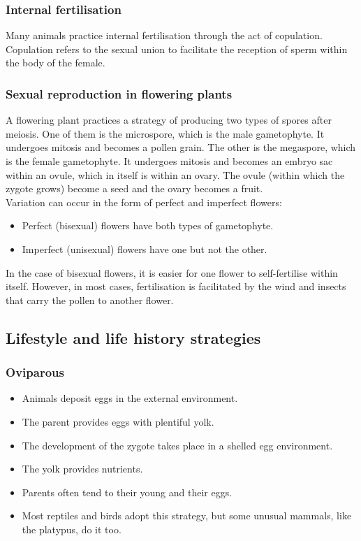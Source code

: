\documentclass[11pt]{article}
\begin{document}
\subsubsection{Internal fertilisation}
\label{sec:org912b6bd}
Many animals practice internal fertilisation through the act of copulation. Copulation refers to the sexual union to facilitate the reception of sperm within the body of the female.

\subsubsection{Sexual reproduction in flowering plants}
\label{sec:org2ac2f1b}
A flowering plant practices a strategy of producing two types of spores after meiosis. One of them is the microspore, which is the male gametophyte. It undergoes mitosis and becomes a pollen grain. The other is the megaspore, which is the female gametophyte. It undergoes mitosis and becomes an embryo sac within an ovule, which in itself is within an ovary. The ovule (within which the zygote grows) become a seed and the ovary becomes a fruit.
\\[0pt]

Variation can occur in the form of perfect and imperfect flowers:
\begin{itemize}
\item Perfect (bisexual) flowers have both types of gametophyte.
\item Imperfect (unisexual) flowers have one but not the other.
\end{itemize}

In the case of bisexual flowers, it is easier for one flower to self-fertilise within itself. However, in most cases, fertilisation is facilitated by the wind and insects that carry the pollen to another flower.

\newpage

\subsection{Lifestyle and life history strategies}
\label{sec:orgca4ec59}

\subsubsection{Oviparous}
\label{sec:org68af96e}
\begin{itemize}
\item Animals deposit eggs in the external environment.
\item The parent provides eggs with plentiful yolk.
\item The development of the zygote takes place in a shelled egg environment.
\item The yolk provides nutrients.
\item Parents often tend to their young and their eggs.
\item Most reptiles and birds adopt this strategy, but some unusual mammals, like the platypus, do it too.
\end{itemize}
\end{document}
